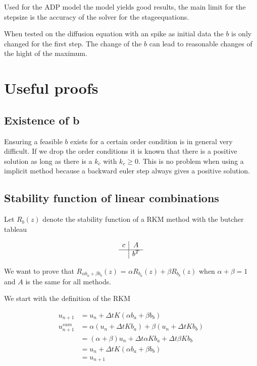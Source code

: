 \documentclass{article}
\begin{document}
Used for the ADP model the model yields good results, the main limit for the stepsize is the accuracy of the solver for the stageequations.

When tested on the diffusion equation with an spike as initial data the $b$ is only changed for the first step. The change of the $b$ can lead to reasonable changes of the hight of the maximum. 



\section{Useful proofs}

\subsection{Existence of b}
Ensuring a feasible $b$ exists for a certain order condition is in general very difficult.
If we drop the order conditions it is known that there is a positive solution as long as there is a $k_c$ with $k_c \geq 0$.
This is no problem when using a implicit method because a backward euler step always gives a positive solution. 

\subsection{Stability function of linear combinations}
Let $R_b(z)$ denote the stability function of a RKM method with the butcher tableau

$$
\begin{array}
{c|c}
c & A\\
\hline
& b^T
\end{array}
$$

We want to prove that $R_{\alpha b_a+\beta b_b}(z)$ = $\alpha R_{ b_a}(z)+\beta R_{b_b}(z)$ when $\alpha + \beta = 1$ and $A$ is the same for all methods.

We start with the definition of the RKM

\begin{align}
u_{n+1} &= u_n + \Delta t K (\alpha b_a+\beta b_b) \label{eq:u_n+1}  \\
u_{n+1}^{sum} &= \alpha (u_n + \Delta t K b_a) + \beta (u_n + \Delta t K b_b) \label{eq:u_n+1_sum} \\
& = (\alpha + \beta) u_n + \Delta t \alpha K b_a + \Delta t \beta K b_b \\
&= u_n + \Delta t K (\alpha b_a+\beta b_b) \\
&=u_{n+1} 
\end{align}
\end{document}
